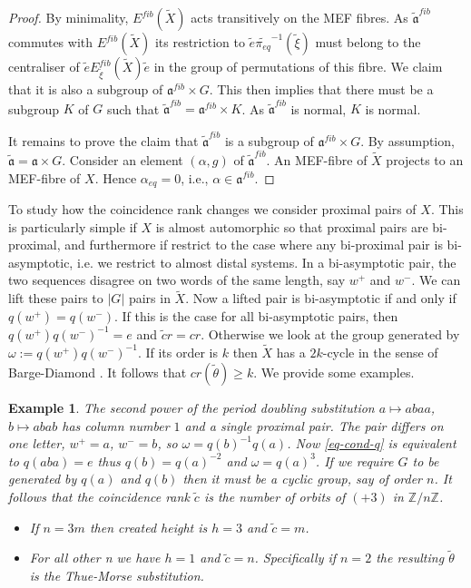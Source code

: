 \documentclass[10pt,a4paper]{amsart}
\newtheorem{example}[theorem]{Example}
\numberwithin{equation}{section}
\newcommand{\Z}{\mathbb Z}
\newcommand{\aut}{{\mathfrak a}}
\newcommand{\pe}{\pi_{eq}}
\newcommand{\tpe}{\widetilde{\pe}}
\newcommand{\Ef}{E^{fib}}
\begin{document}
\begin{proof}
By minimality, $\Ef(\tilde X)$ acts transitively on the MEF fibres. As $\tilde\aut^{fib}$ commutes with $\Ef(\tilde X)$ its restriction to $\tilde e\tpe^{-1}(\tilde \xi)$ must belong to the centraliser of $\tilde e\Ef_{\tilde \xi}(\tilde X)\tilde e$ in the group of permutations of this fibre. 
We claim that it is also a subgroup of $\aut^{fib}\times G$. This then implies that there must be  a subgroup $K$ of $G$ such that $\tilde\aut^{fib} = \aut^{fib}\times K$. As $\tilde\aut^{fib}$ is normal, $K$ is normal.  

It remains to prove the claim that $\tilde\aut^{fib}$ is a subgroup of $\aut^{fib}\times G$.  By assumption, $\tilde\aut=  \aut\times G$.
Consider an element $(\alpha,g)$ of 
$ \tilde\aut^{fib}$. An MEF-fibre of $\tilde X$ projects to an 
MEF-fibre of $X$. Hence $\alpha_{eq}=0$, i.e., $\alpha\in\aut^{fib}$.
\end{proof}
To study how the coincidence  rank changes we consider proximal pairs of $X$. This is particularly simple if $X$ is almost automorphic so that proximal pairs are bi-proximal, and furthermore if restrict to the case where any bi-proximal pair is  bi-asymptotic, i.e. we restrict to almost distal systems.
In a bi-asymptotic pair, the two sequences disagree on two words of the same length, say $w^+$ and $w^-$. We can lift these pairs to $|G|$ pairs in $\tilde X$. Now a lifted pair is bi-asymptotic if and only if $q(w^+) = q(w^-)$. If this is the case for all bi-asymptotic pairs, then $q(w^+)q(w^-)^{-1}=e$ and $\tilde cr = cr$. Otherwise we look at the group generated by $\omega:=q(w^+)q(w^-)^{-1}$. If its order is $k$ then $\tilde X$ has a $2k$-cycle in the sense of Barge-Diamond \cite{Barge-Diamond:2007}. It follows that $cr(\tilde\theta) \geq k$. 
We provide some examples.
\begin{example}
The second power of the period doubling substitution $a\mapsto abaa$, $b\mapsto abab$ has column number $1$ and a single proximal pair. The pair differs on one letter,  $w^+=a$, $w^-=b$, so $\omega = q(b)^{-1} q(a)$. Now \eqref{eq-cond-q} is equivalent to $q(aba) = e$ thus $q(b) = q(a)^{-2}$ and $\omega=q(a)^3$. If we require $G$ to be generated by $q(a)$ and $q(b)$ then it must be a cyclic group, say of order $n$. It follows that the coincidence rank $\tilde c$ is the number of orbits of $(+3)$ in $\Z/n\Z$.
\begin{itemize}
 \item If $n=3m$ then created height is $h=3$ and $\tilde c = m$.
 \item For all other n we have $h=1$ and $\tilde c = n$. Specifically  if $n=2$ the resulting $\tilde \theta$ is the Thue-Morse substitution. 
\end{itemize}
\end{example}
\end{document}
